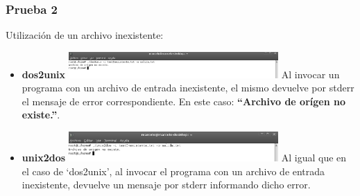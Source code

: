 \documentclass[a4paper,10pt]{article}
\begin{document}
    \subsubsection{Prueba 2}
    Utilizaci\'on de un archivo inexistente:
      \begin{itemize}
      \item \textbf{dos2unix}
      \newline
      \includegraphics[width=8cm, viewport=0 0 1168 147]{../Informe/Imagenes/prueba2-archivo-dos2unix.png}
      \newline
      Al invocar un programa con un archivo de entrada inexistente, el mismo devuelve por stderr el mensaje de error correspondiente.
      En este caso: {\bf ``Archivo de or\'igen no existe.''}.
      
      \item \textbf{unix2dos}
      \newline
      \includegraphics[width=8cm, viewport=0 0 895 128]{../Informe/Imagenes/prueba2-archivo-unix2dos.png}
      \newline
      Al igual que en el caso de `dos2unix', al invocar el programa con un archivo de entrada inexistente, devuelve un mensaje por stderr
      informando dicho error.
      
      \end{itemize}
\end{document}
